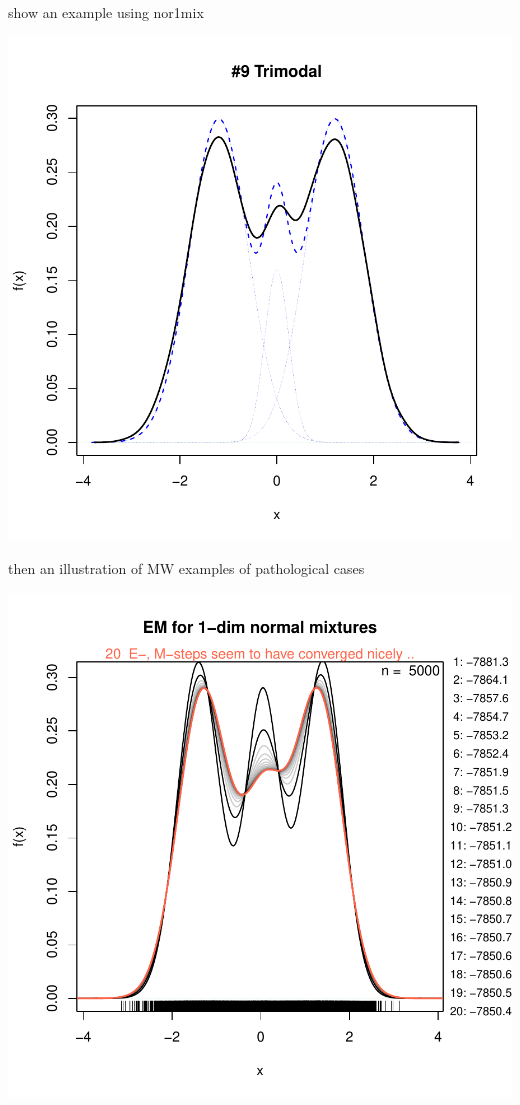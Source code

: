show an example using nor1mix



\includegraphics{chapter1-003}



then an illustration of MW examples of pathological cases


\includegraphics{chapter1-nor1mixEx}


